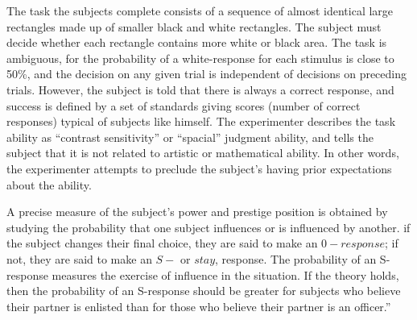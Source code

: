 The task the subjects complete consists of a sequence of almost identical large rectangles made up of smaller black and white rectangles. The subject must decide whether each rectangle contains more white or black area. The task is ambiguous, for the probability of a white-response for each stimulus is close to 50\%, and the decision on any given trial is independent of decisions on preceding trials. However, the subject is told that there is always a correct response, and success is defined by a set of standards giving scores (number of correct responses) typical of subjects like himself. The experimenter describes the task ability as ``contrast sensitivity'' or ``spacial'' judgment ability, and tells the subject that it is not related to artistic or mathematical ability. In other words, the experimenter attempts to preclude the subject's having prior expectations about the ability.

A precise measure of the subject's power and prestige position is obtained by studying the probability that one subject influences or is influenced by another. if the subject changes their final choice, they are said to make an $0-response$; if not, they are said to make an $S-$ or $stay$, response. The probability of an S-response measures the exercise of influence in the situation. If the theory holds, then the probability of an S-response should be greater for subjects who believe their partner is enlisted than for those who believe their partner is an officer.''